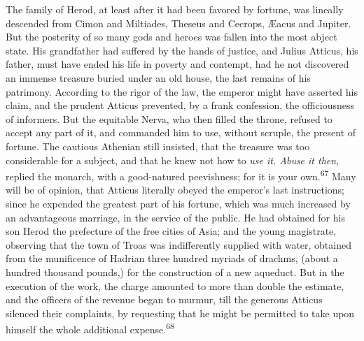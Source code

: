 

The family of Herod, at least after it had been favored by
fortune, was lineally descended from Cimon and Miltiades, Theseus
and Cecrops, Æacus and Jupiter. But the posterity of so many gods
and heroes was fallen into the most abject state. His grandfather
had suffered by the hands of justice, and Julius Atticus, his
father, must have ended his life in poverty and contempt, had he
not discovered an immense treasure buried under an old house, the
last remains of his patrimony. According to the rigor of the law,
the emperor might have asserted his claim, and the prudent
Atticus prevented, by a frank confession, the officiousness of
informers. But the equitable Nerva, who then filled the throne,
refused to accept any part of it, and commanded him to use,
without scruple, the present of fortune. The cautious Athenian
still insisted, that the treasure was too considerable for a
subject, and that he knew not how to \textit{use it. Abuse it then},
replied the monarch, with a good-natured peevishness; for it is
your own.\textsuperscript{67} Many will be of opinion, that Atticus literally
obeyed the emperor’s last instructions; since he expended the
greatest part of his fortune, which was much increased by an
advantageous marriage, in the service of the public. He had
obtained for his son Herod the prefecture of the free cities of
Asia; and the young magistrate, observing that the town of Troas
was indifferently supplied with water, obtained from the
munificence of Hadrian three hundred myriads of drachms, (about a
hundred thousand pounds,) for the construction of a new aqueduct.
But in the execution of the work, the charge amounted to more
than double the estimate, and the officers of the revenue began
to murmur, till the generous Atticus silenced their complaints,
by requesting that he might be permitted to take upon himself the
whole additional expense.\textsuperscript{68}


